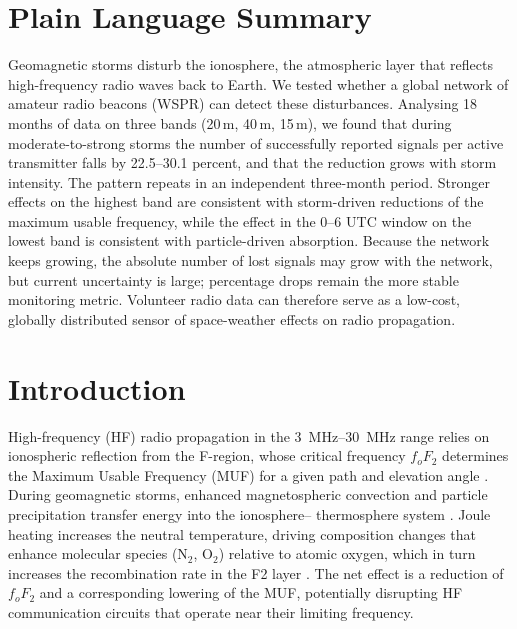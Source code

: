 \documentclass{agujournal2019}
\begin{document}
\section*{Plain Language Summary}

Geomagnetic storms disturb the ionosphere, the atmospheric layer that
reflects high-frequency radio waves back to Earth. We tested whether a
global network of amateur radio beacons (WSPR) can detect these
disturbances. Analysing 18 months of data on three bands (20\,m, 40\,m,
15\,m), we found that during moderate-to-strong storms the number of
successfully reported signals per active transmitter falls by 22.5--30.1 percent, and that the
reduction grows with storm intensity. The pattern repeats in an
independent three-month period. Stronger effects on the highest band
are consistent with storm-driven reductions of the maximum usable
frequency, while the effect in the 0--6 UTC window on the lowest band is
consistent with particle-driven absorption. Because the network keeps
growing, the absolute number of lost signals may grow with the network,
but current uncertainty is large; percentage drops remain the more stable
monitoring metric. Volunteer radio data can therefore
serve as a low-cost, globally distributed sensor of space-weather
effects on radio propagation.


\section{Introduction}

High-frequency (HF) radio propagation in the \SIrange{3}{30}{MHz} range relies
on ionospheric reflection from the F-region, whose critical frequency $f_oF_2$
determines the Maximum Usable Frequency (MUF) for a given path and elevation
angle \citep{davies1990}. During geomagnetic storms, enhanced magnetospheric
convection and particle precipitation transfer energy into the ionosphere--
thermosphere system \citep{gonzalez1994,tsurutani2003}. Joule heating increases the neutral temperature, driving
composition changes that enhance molecular species (N$_2$, O$_2$) relative to
atomic oxygen, which in turn increases the recombination rate in the F2 layer
\citep{proelss1995}. The net effect is a reduction of $f_oF_2$ and a
corresponding lowering of the MUF, potentially disrupting HF communication
circuits that operate near their limiting frequency.
\end{document}
